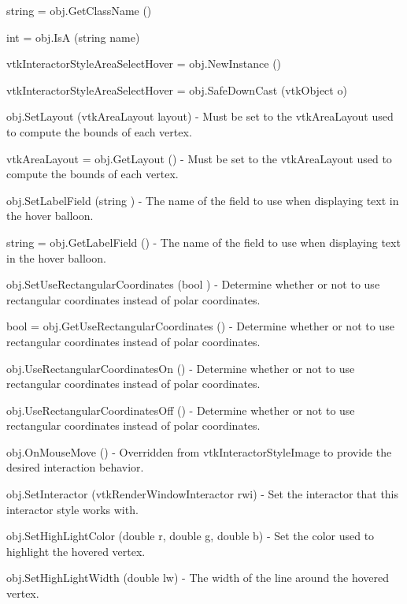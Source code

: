 \begin{DoxyItemize}
\item {\ttfamily string = obj.\-Get\-Class\-Name ()}  
\item {\ttfamily int = obj.\-Is\-A (string name)}  
\item {\ttfamily vtk\-Interactor\-Style\-Area\-Select\-Hover = obj.\-New\-Instance ()}  
\item {\ttfamily vtk\-Interactor\-Style\-Area\-Select\-Hover = obj.\-Safe\-Down\-Cast (vtk\-Object o)}  
\item {\ttfamily obj.\-Set\-Layout (vtk\-Area\-Layout layout)} -\/ Must be set to the vtk\-Area\-Layout used to compute the bounds of each vertex.  
\item {\ttfamily vtk\-Area\-Layout = obj.\-Get\-Layout ()} -\/ Must be set to the vtk\-Area\-Layout used to compute the bounds of each vertex.  
\item {\ttfamily obj.\-Set\-Label\-Field (string )} -\/ The name of the field to use when displaying text in the hover balloon.  
\item {\ttfamily string = obj.\-Get\-Label\-Field ()} -\/ The name of the field to use when displaying text in the hover balloon.  
\item {\ttfamily obj.\-Set\-Use\-Rectangular\-Coordinates (bool )} -\/ Determine whether or not to use rectangular coordinates instead of polar coordinates.  
\item {\ttfamily bool = obj.\-Get\-Use\-Rectangular\-Coordinates ()} -\/ Determine whether or not to use rectangular coordinates instead of polar coordinates.  
\item {\ttfamily obj.\-Use\-Rectangular\-Coordinates\-On ()} -\/ Determine whether or not to use rectangular coordinates instead of polar coordinates.  
\item {\ttfamily obj.\-Use\-Rectangular\-Coordinates\-Off ()} -\/ Determine whether or not to use rectangular coordinates instead of polar coordinates.  
\item {\ttfamily obj.\-On\-Mouse\-Move ()} -\/ Overridden from vtk\-Interactor\-Style\-Image to provide the desired interaction behavior.  
\item {\ttfamily obj.\-Set\-Interactor (vtk\-Render\-Window\-Interactor rwi)} -\/ Set the interactor that this interactor style works with.  
\item {\ttfamily obj.\-Set\-High\-Light\-Color (double r, double g, double b)} -\/ Set the color used to highlight the hovered vertex.  
\item {\ttfamily obj.\-Set\-High\-Light\-Width (double lw)} -\/ The width of the line around the hovered vertex.  

\end{DoxyItemize}
